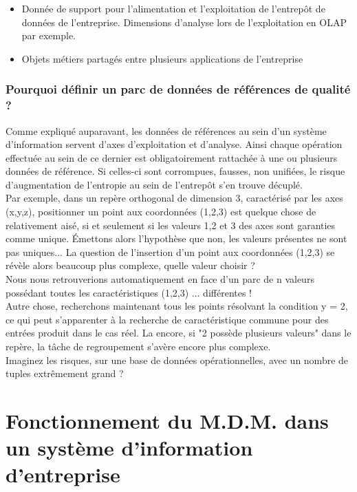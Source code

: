 \begin{itemize}
\item Donnée de support pour l'alimentation et l'exploitation de l'entrepôt de données de l'entreprise. Dimensions d'analyse lors de l'exploitation en OLAP par exemple.
\item Objets métiers partagés entre plusieurs applications de l'entreprise
\end{itemize}


\subsubsection{Pourquoi définir un parc de données de références de qualité ?}

Comme expliqué auparavant, les données de références au sein d'un système d'information servent d'axes d'exploitation et d'analyse. Ainsi chaque opération effectuée au sein de ce dernier est obligatoirement rattachée à une ou plusieurs données de référence. Si celles-ci sont corrompues, fausses, non unifiées, le risque d'augmentation de l'entropie au sein de l'entrepôt s'en trouve décuplé.\\
Par exemple, dans un repère orthogonal de dimension 3, caractérisé par les axes (x,y,z), positionner un point aux coordonnées (1,2,3) est quelque chose de relativement aisé, si et seulement si les valeurs 1,2 et 3 des axes sont garanties comme unique.
Émettons alors l'hypothèse que non, les valeurs présentes ne sont pas uniques... La question de l'insertion d'un point aux coordonnées (1,2,3) se révèle alors beaucoup plus complexe, quelle valeur choisir ? \\ 
Nous nous retrouverions automatiquement en face d'un parc de n valeurs possédant toutes les caractéristiques (1,2,3) ... différentes !\\
Autre chose, recherchons maintenant tous les points résolvant la condition y = 2, ce qui peut s'apparenter à la recherche de caractéristique commune pour des entrées produit dans le cas réel.
La encore, si "2 possède plusieurs valeurs" dans le repère, la tâche de regroupement s'avère encore plus complexe.\\
Imaginez les risques, sur une base de données opérationnelles, avec un nombre de tuples extrêmement grand ?\\

\section{Fonctionnement du M.D.M. dans un système d'information d'entreprise}

